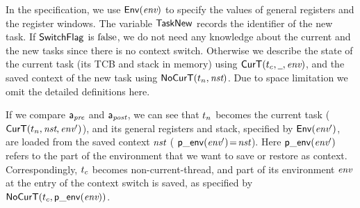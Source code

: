
In the specification,
we use $\mathsf{Env}({\textit{env}})$ to specify the values of
general registers and the register windows.
The variable $\mathsf{TaskNew}$ records the identifier of the new task.
If $\mathsf{SwitchFlag}$ is $\text{false}$, we do not need any knowledge
about the current and the new tasks since there is no
context switch. Otherwise we describe the state
of the current task (its TCB and stack in memory)
using $\mathsf{CurT}({t_c}, {\underline{\ \,}}, {\textit{env}})$,
and the saved context of the new task using
$\mathsf{NoCurT}({t_n}, {\textit{nst}})$.
Due to space limitation we omit the detailed
definitions here.

If we compare $\mathsf{a}_{\textit{pre}}$ and $\mathsf{a}_{\textit{post}}$, we can see that
$t_n$ becomes the current task
($\mathsf{CurT}({t_n}, {\textit{nst}}, {\textit{env}'})$),
and its general registers and stack, specified by
$\mathsf{Env}({\textit{env}'})$, are loaded from the saved context
$\textit{nst}$ (\ie{} $\mathsf{p\_env}({\textit{env}'})\!=\!\textit{nst}$).
Here $\mathsf{p\_env}({\textit{env}'})$ refers to the part of the environment
that we want to save or restore as context.
Correspondingly, $t_c$ becomes non-current-thread,
and part of its environment $\textit{env}$ at the entry of
the context switch is saved, as specified
by $\mathsf{NoCurT}({t_c}, {\mathsf{p\_env}({\textit{env}})})$.

